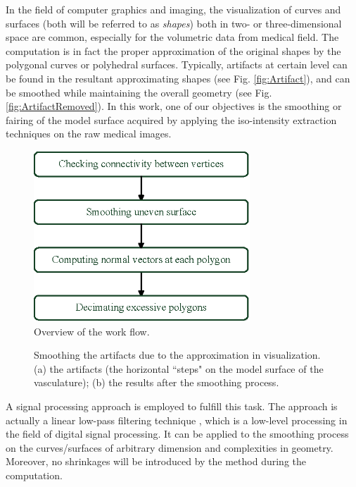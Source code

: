 In the field of computer graphics and imaging, the visualization of curves and surfaces (both will be referred to as \emph{shapes}) both in two- or three-dimensional space are common, especially for the volumetric data from medical field. %
The computation is in fact the proper approximation of the original shapes by the polygonal curves or polyhedral surfaces.
Typically, artifacts at certain level can be found in the resultant approximating shapes (see Fig. \ref{fig:Artifact}), and can be smoothed while maintaining the overall geometry (see Fig. \ref{fig:ArtifactRemoved}). %
In this work, one of our objectives is the smoothing or fairing of the model surface acquired by applying the iso-intensity extraction techniques on the raw medical images.
\begin{figure}[t]
\centering
\includegraphics[width=3.2in]{figures/chap06/DataFlow.eps}
\caption{Overview of the work flow.}
\label{fig:DataFlow6}
\end{figure}
\begin{figure}[t]
\centering
{}
\hfil
{}
\caption{Smoothing the artifacts due to the approximation in visualization. (a) the artifacts (the horizontal ``steps" on the model surface of the vasculature); (b) the results after the smoothing process.}%
\label{fig:ArtifactComparison}
\end{figure}
A signal processing approach is employed to fulfill this task.
The approach is actually a linear low-pass filtering technique \cite{Taubin1995ICCV}, which is a low-level processing in the field of digital signal processing.
It can be applied to the smoothing process on the curves/surfaces of arbitrary dimension and complexities in geometry.
Moreover, no shrinkages will be introduced by the method during the computation.

